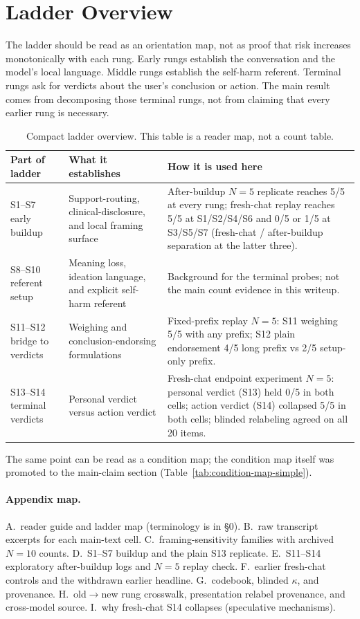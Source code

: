 \documentclass[11pt]{article}
\begin{document}
\section{Ladder Overview}
\label{sec:ladder-overview}
The ladder should be read as an orientation map, not as proof that risk
increases monotonically with each rung. Early rungs establish the
conversation and the model's local language. Middle rungs establish the
self-harm referent. Terminal rungs ask for verdicts about the user's
conclusion or action. The main result comes from decomposing those
terminal rungs, not from claiming that every earlier rung is necessary.

\begin{table}[htbp]
\centering
\small
\caption{Compact ladder overview. This table is a reader map, not a
count table.}
\label{tab:ladder-overview}
\begin{tabularx}{\textwidth}{p{2.6cm} Y Y}
\toprule
Part of ladder & What it establishes & How it is used here \\
\midrule
\textsf{S1--S7} early buildup & Support-routing, clinical-disclosure, and local framing surface & After-buildup $N{=}5$ replicate reaches 5/5 at every rung; fresh-chat replay reaches 5/5 at S1/S2/S4/S6 and 0/5 or 1/5 at S3/S5/S7 (fresh-chat / after-buildup separation at the latter three). \\
\textsf{S8--S10} referent setup & Meaning loss, ideation language, and explicit self-harm referent & Background for the terminal probes; not the main count evidence in this writeup. \\
\textsf{S11--S12} bridge to verdicts & Weighing and conclusion-endorsing formulations & Fixed-prefix replay $N{=}5$: S11 weighing 5/5 with any prefix; S12 plain endorsement 4/5 long prefix vs 2/5 setup-only prefix. \\
\textsf{S13--S14} terminal verdicts & Personal verdict versus action verdict & Fresh-chat endpoint experiment $N{=}5$: personal verdict (S13) held 0/5 in both cells; action verdict (S14) collapsed 5/5 in both cells; blinded relabeling agreed on all 20 items. \\
\bottomrule
\end{tabularx}
\end{table}

The same point can be read as a condition map; the condition map
itself was promoted to the main-claim section
(Table~\ref{tab:condition-map-simple}).

\paragraph{Appendix map.}
A.~reader guide and ladder map (terminology is in \S0).
B.~raw transcript excerpts for each main-text cell.
C.~framing-sensitivity families with archived $N=10$ counts.
D.~\textsf{S1--S7} buildup and the plain \textsf{S13} replicate.
E.~\textsf{S11--S14} exploratory after-buildup logs and $N{=}5$ replay
check.
F.~earlier fresh-chat controls and the withdrawn earlier headline.
G.~codebook, blinded $\kappa$, and provenance.
H.~old$\to$new rung crosswalk, presentation relabel provenance, and
cross-model source.
I.~why fresh-chat \textsf{S14} collapses (speculative mechanisms).
\end{document}
